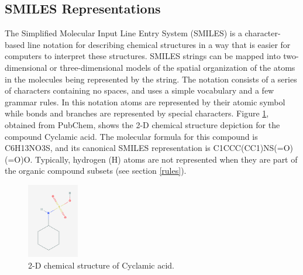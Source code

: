 \subsection{SMILES Representations\label{smiles}}
The Simplified Molecular Input Line Entry System (SMILES) is a character-based line notation for describing chemical structures in a way that is easier for computers to interpret
these structures. SMILES strings can be mapped into two-dimensional or three-dimensional models of the spatial organization of the atoms in the molecules being represented by the string. The notation consists of a series of characters containing no spaces, and uses a simple vocabulary and a few grammar rules. In this notation atoms are represented by their atomic symbol while bonds and branches are represented by special characters. Figure \ref{fig:cyclamic}, obtained from PubChem,  shows the 2-D chemical structure depiction for the compound Cyclamic acid. The molecular formula for this compound is C6H13NO3S, and its canonical SMILES representation is C1CCC(CC1)NS(=O)(=O)O. Typically, hydrogen (H) atoms are not represented when they are part of the organic compound subsets (see section \ref{rules}).

\begin{figure}[htb]
        \centering
        \includegraphics[width=0.20\textwidth]{figures/cyclamic_acid.png}
        \caption{2-D chemical structure of Cyclamic acid.}
        \label{fig:cyclamic}
    \end{figure}
    
